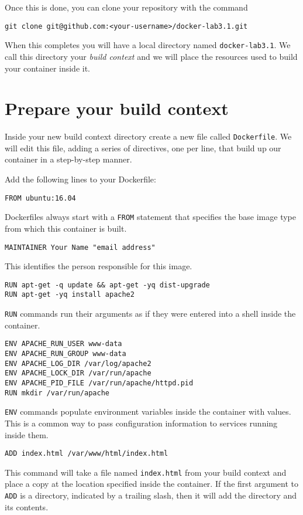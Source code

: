 \documentclass{article}
\begin{document}
Once this is done, you can clone your repository with the command

\texttt{git clone git@github.com:<your-username>/docker-lab3.1.git}

When this completes you will have a local directory named \texttt{docker-lab3.1}. We call this directory your \emph{build context} and we will place the resources used to build your container inside it.

\section{Prepare your build context}
Inside your new build context directory create a new file called \texttt{Dockerfile}. We will edit this file, adding a series of directives, one per line, that build up our container in a step-by-step manner.

Add the following lines to your Dockerfile:

\texttt{FROM ubuntu:16.04}

Dockerfiles always start with a \texttt{FROM} statement that specifies the base image type from which this container is built.

\texttt{MAINTAINER Your Name "email address"}

This identifies the person responsible for this image.

\begin{verbatim}
RUN apt-get -q update && apt-get -yq dist-upgrade
RUN apt-get -yq install apache2
\end{verbatim}

\texttt{RUN} commands run their arguments as if they were entered into a shell inside the container.

\begin{verbatim}
ENV APACHE_RUN_USER www-data
ENV APACHE_RUN_GROUP www-data
ENV APACHE_LOG_DIR /var/log/apache2
ENV APACHE_LOCK_DIR /var/run/apache
ENV APACHE_PID_FILE /var/run/apache/httpd.pid
RUN mkdir /var/run/apache
\end{verbatim}

\texttt{ENV} commands populate environment variables inside the container with values. This is a common way to pass configuration information to services running inside them.

\texttt{ADD index.html /var/www/html/index.html }

This command will take a file named \texttt{index.html} from your build context and place a copy at the location specified inside the container. If the first argument to \texttt{ADD} is a directory, indicated by a trailing slash, then it will add the directory and its contents.
\end{document}
